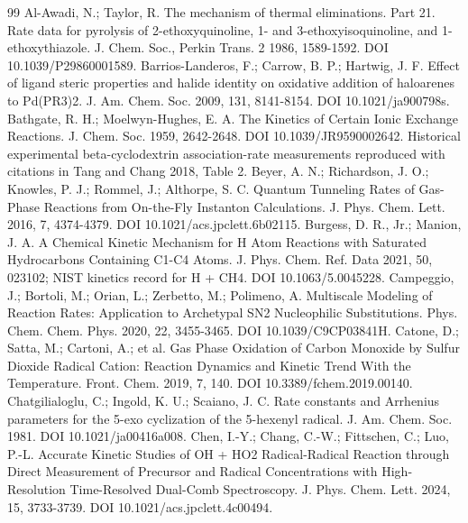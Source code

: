 \begin{thebibliography}{99}
 Al-Awadi, N.; Taylor, R. The mechanism of thermal eliminations. Part 21. Rate data for pyrolysis of 2-ethoxyquinoline, 1- and 3-ethoxyisoquinoline, and 1-ethoxythiazole. J. Chem. Soc., Perkin Trans. 2 1986, 1589-1592. DOI 10.1039/P29860001589.
 Barrios-Landeros, F.; Carrow, B. P.; Hartwig, J. F. Effect of ligand steric properties and halide identity on oxidative addition of haloarenes to Pd(PR3)2. J. Am. Chem. Soc. 2009, 131, 8141-8154. DOI 10.1021/ja900798s.
 Bathgate, R. H.; Moelwyn-Hughes, E. A. The Kinetics of Certain Ionic Exchange Reactions. J. Chem. Soc. 1959, 2642-2648. DOI 10.1039/JR9590002642.
 Historical experimental beta-cyclodextrin association-rate measurements reproduced with citations in Tang and Chang 2018, Table 2.
 Beyer, A. N.; Richardson, J. O.; Knowles, P. J.; Rommel, J.; Althorpe, S. C. Quantum Tunneling Rates of Gas-Phase Reactions from On-the-Fly Instanton Calculations. J. Phys. Chem. Lett. 2016, 7, 4374-4379. DOI 10.1021/acs.jpclett.6b02115.
 Burgess, D. R., Jr.; Manion, J. A. A Chemical Kinetic Mechanism for H Atom Reactions with Saturated Hydrocarbons Containing C1-C4 Atoms. J. Phys. Chem. Ref. Data 2021, 50, 023102; NIST kinetics record for H + CH4. DOI 10.1063/5.0045228.
 Campeggio, J.; Bortoli, M.; Orian, L.; Zerbetto, M.; Polimeno, A. Multiscale Modeling of Reaction Rates: Application to Archetypal SN2 Nucleophilic Substitutions. Phys. Chem. Chem. Phys. 2020, 22, 3455-3465. DOI 10.1039/C9CP03841H.
 Catone, D.; Satta, M.; Cartoni, A.; et al. Gas Phase Oxidation of Carbon Monoxide by Sulfur Dioxide Radical Cation: Reaction Dynamics and Kinetic Trend With the Temperature. Front. Chem. 2019, 7, 140. DOI 10.3389/fchem.2019.00140.
 Chatgilialoglu, C.; Ingold, K. U.; Scaiano, J. C. Rate constants and Arrhenius parameters for the 5-exo cyclization of the 5-hexenyl radical. J. Am. Chem. Soc. 1981. DOI 10.1021/ja00416a008.
 Chen, I.-Y.; Chang, C.-W.; Fittschen, C.; Luo, P.-L. Accurate Kinetic Studies of OH + HO2 Radical-Radical Reaction through Direct Measurement of Precursor and Radical Concentrations with High-Resolution Time-Resolved Dual-Comb Spectroscopy. J. Phys. Chem. Lett. 2024, 15, 3733-3739. DOI 10.1021/acs.jpclett.4c00494.

\end{thebibliography}
